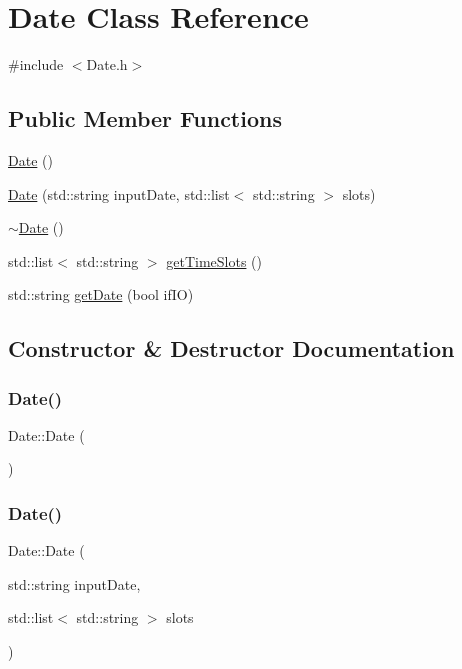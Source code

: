 \hypertarget{class_date}{}\section{Date Class Reference}
\label{class_date}


{\ttfamily \#include $<$Date.\+h$>$}

\subsection*{Public Member Functions}
\begin{DoxyCompactItemize}
\item 
\mbox{\hyperlink{class_date_a4e59ed4ba66eec61c27460c5d09fa1bd}{Date}} ()
\item 
\mbox{\hyperlink{class_date_a6e2d948c1ef7a19ca6989db1f36b10bb}{Date}} (std\+::string input\+Date, std\+::list$<$ std\+::string $>$ slots)
\item 
\mbox{\hyperlink{class_date_ade4b469433b7966cc034cbcc6799233b}{$\sim$\+Date}} ()
\item 
std\+::list$<$ std\+::string $>$ \mbox{\hyperlink{class_date_acfcdabd01984684dabbe544163a4b35b}{get\+Time\+Slots}} ()
\item 
std\+::string \mbox{\hyperlink{class_date_a7de54a65cdd67cf300212b31cdc3d8ee}{get\+Date}} (bool if\+IO)
\end{DoxyCompactItemize}


\subsection{Constructor \& Destructor Documentation}
\mbox{\label{class_date_a4e59ed4ba66eec61c27460c5d09fa1bd}} 
\subsubsection{\texorpdfstring{Date()}{Date()}\hspace{0.1cm}{\footnotesize\ttfamily [1/2]}}
{\footnotesize\ttfamily Date\+::\+Date (\begin{DoxyParamCaption}{ }\end{DoxyParamCaption})}

\mbox{\label{class_date_a6e2d948c1ef7a19ca6989db1f36b10bb}} 
\subsubsection{\texorpdfstring{Date()}{Date()}\hspace{0.1cm}{\footnotesize\ttfamily [2/2]}}
{\footnotesize\ttfamily Date\+::\+Date (\begin{DoxyParamCaption}\item[{std\+::string}]{input\+Date,  }\item[{std\+::list$<$ std\+::string $>$}]{slots }\end{DoxyParamCaption})}

